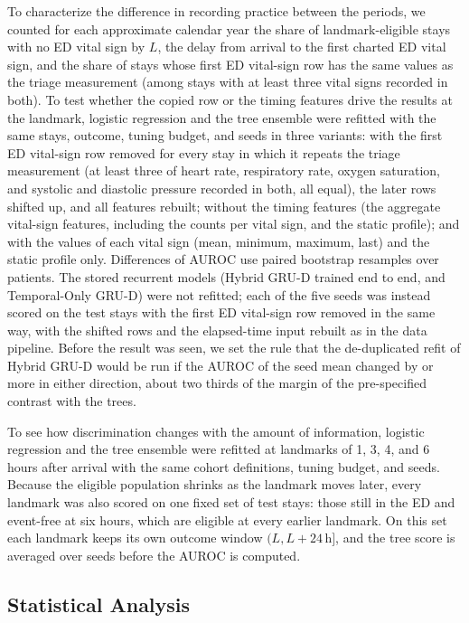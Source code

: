 To characterize the difference in recording practice between the periods, we counted for each approximate calendar year the share of landmark-eligible stays with no ED vital sign by $L$, the delay from arrival to the first charted ED vital sign, and the share of stays whose first ED vital-sign row has the same values as the triage measurement (among stays with at least three vital signs recorded in both). To test whether the copied row or the timing features drive the results at the landmark, logistic regression and the tree ensemble were refitted with the same stays, outcome, tuning budget, and seeds in three variants: with the first ED vital-sign row removed for every stay in which it repeats the triage measurement (at least three of heart rate, respiratory rate, oxygen saturation, and systolic and diastolic pressure recorded in both, all equal), the later rows shifted up, and all features rebuilt; without the timing features (the aggregate vital-sign features, including the counts per vital sign, and the static profile); and with the values of each vital sign (mean, minimum, maximum, last) and the static profile only. Differences of AUROC use paired bootstrap resamples over patients. The stored recurrent models (Hybrid GRU-D trained end to end, and Temporal-Only GRU-D) were not refitted; each of the five seeds was instead scored on the test stays with the first ED vital-sign row removed in the same way, with the shifted rows and the elapsed-time input rebuilt as in the data pipeline. Before the result was seen, we set the rule that the de-duplicated refit of Hybrid GRU-D would be run if the AUROC of the seed mean changed by \RVGrudRule{} or more in either direction, about two thirds of the margin of the pre-specified contrast with the trees.

To see how discrimination changes with the amount of information, logistic regression and the tree ensemble were refitted at landmarks of 1, 3, 4, and 6 hours after
arrival with the same cohort definitions, tuning budget, and seeds. Because the eligible population shrinks as the landmark moves later, every landmark was also
scored on one fixed set of test stays: those still in the ED and event-free at six hours, which are eligible at every earlier landmark. On this set each landmark
keeps its own outcome window $(L, L+24\,\mathrm{h}]$, and the tree score is averaged over seeds before the AUROC is computed.

\subsection{Statistical Analysis}
\label{sec:methods-stats}

